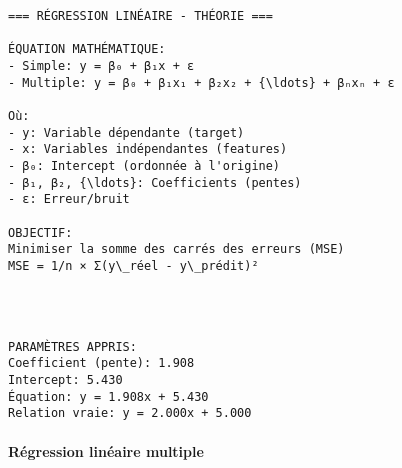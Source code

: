 \documentclass[11pt]{article}
\begin{document}
    \begin{Verbatim}[commandchars=\\\{\}]
=== RÉGRESSION LINÉAIRE - THÉORIE ===

ÉQUATION MATHÉMATIQUE:
- Simple: y = β₀ + β₁x + ε
- Multiple: y = β₀ + β₁x₁ + β₂x₂ + {\ldots} + βₙxₙ + ε

Où:
- y: Variable dépendante (target)
- x: Variables indépendantes (features)
- β₀: Intercept (ordonnée à l'origine)
- β₁, β₂, {\ldots}: Coefficients (pentes)
- ε: Erreur/bruit

OBJECTIF:
Minimiser la somme des carrés des erreurs (MSE)
MSE = 1/n × Σ(y\_réel - y\_prédit)²

    \end{Verbatim}

    \begin{center}
    \end{center}
    { \hspace*{\fill} \\}
    
    \begin{Verbatim}[commandchars=\\\{\}]

PARAMÈTRES APPRIS:
Coefficient (pente): 1.908
Intercept: 5.430
Équation: y = 1.908x + 5.430
Relation vraie: y = 2.000x + 5.000
    \end{Verbatim}

    \paragraph{Régression linéaire
multiple}\label{ruxe9gression-linuxe9aire-multiple}
\end{document}
